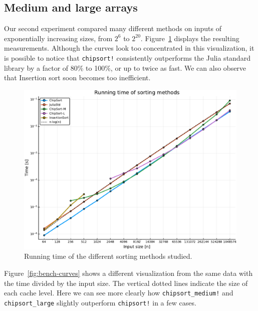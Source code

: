 \documentclass{juliacon}
\begin{document}
\subsection{Medium and large arrays}
Our second experiment compared many different methods on inputs of exponentially increasing sizes, from $2^6$ to $2^{20}$. Figure~\ref{fig:bench-time} displays the resulting measurements. Although the curves look too concentrated in this visualization, it is possible to notice that {\tt chipsort!} consistently outperforms the Julia standard library by a factor of 80\% to 100\%, or up to twice as fast. We can also observe that Insertion sort soon becomes too inefficient.

\begin{figure}[htb]
\centerline{\includegraphics[width=\linewidth]{fig/chipsort-bench-time.pdf}}
\caption{Running time of the different sorting methods studied.}
\label{fig:bench-time}
\end{figure}

Figure~\ref{fig:bench-curves} shows a different visualization from the same data with the time divided by the input size. The vertical dotted lines indicate the size of each cache level. Here we can see more clearly how {\tt chipsort\_medium!} and {\tt chipsort\_large} slightly outperform {\tt chipsort!} in a few cases.
\end{document}
